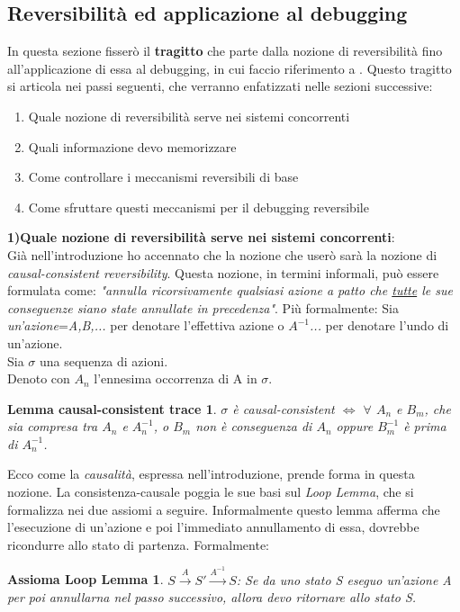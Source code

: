 \documentclass[background.tex]{subfiles}
\begin{document}
\subsection{Reversibilità ed applicazione al debugging}
In questa sezione fisserò il \textbf{tragitto} che parte dalla nozione di reversibilità fino all'applicazione di essa al debugging, in cui faccio riferimento a \cite{lanese18}.
Questo tragitto si articola nei passi seguenti, che verranno enfatizzati nelle sezioni successive:
\begin{enumerate}
	\item Quale nozione di reversibilità serve nei sistemi concorrenti
	\item Quali informazione devo memorizzare
	\item Come controllare i meccanismi reversibili di base
	\item Come sfruttare questi meccanismi per il debugging reversibile
\end{enumerate}
\textbf{1)Quale nozione di reversibilità serve nei sistemi concorrenti}:\\
Già nell'introduzione ho accennato che la nozione che userò sarà la nozione di \textit{causal-consistent reversibility}. Questa nozione, in termini informali, può essere formulata come:
\textit{"annulla ricorsivamente qualsiasi azione a patto che \underline{tutte} le sue conseguenze siano state annullate in precedenza"}.
Più formalmente:
Sia \textit{un'azione}=\textit{A,B,...} per denotare l'effettiva azione o \textit{$A^{-1}$...} per denotare l'undo di un'azione.\\
Sia $\sigma$ una sequenza di azioni.\\
Denoto con $A_{n}$ l'ennesima occorrenza di A in $\sigma$.
\newtheorem*{CausalTrace}{Lemma causal-consistent trace}
\begin{CausalTrace}
$\sigma$ è causal-consistent $\iff$ $\forall$ $A_{n}$ e $B_{m}$, che sia compresa tra $A_{n}$ e $A_{n}^{-1}$, o $B_{m}$ non è conseguenza di $A_{n}$ oppure $B_{m}^{-1}$ è prima di $A_{n}^{-1}$.
\end{CausalTrace}
Ecco come la \textit{causalità}, espressa nell'introduzione, prende forma in questa nozione. La consistenza-causale poggia le sue basi sul \textit{Loop Lemma}, che si formalizza nei due assiomi a seguire.
Informalmente questo lemma afferma che l'esecuzione di un'azione e poi l'immediato annullamento di essa, dovrebbe ricondurre allo stato di partenza.
Formalmente:
\newtheorem{ax1}{Assioma Loop Lemma}
	\begin{ax1}
 		$\displaystyle S\xrightarrow{A}S'\xrightarrow{A^{-1}}S$: Se da uno stato S eseguo un'azione A per poi annullarna nel passo successivo, allora devo ritornare allo stato S.
	\end{ax1}
\end{document}
